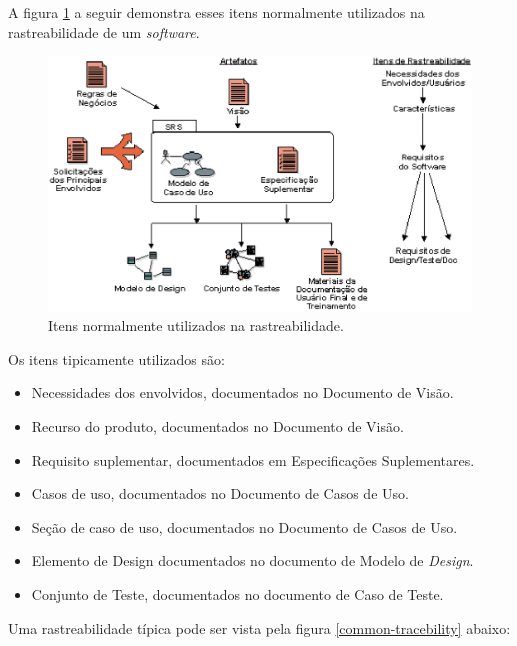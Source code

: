 A figura \ref{common-itens} a seguir demonstra esses itens normalmente utilizados na rastreabilidade de um \textit{software}.

\begin{figure}[htb]
\centering
  \includegraphics[keepaspectratio=true,scale=0.7]
  {figuras/itens_comuns.eps}
  \caption{Itens normalmente utilizados na rastreabilidade.~\cite{rup1}}
  \label{common-itens}
\end{figure}

\clearpage{}


Os itens tipicamente utilizados são:

\begin{itemize}
\item Necessidades dos envolvidos, documentados no Documento de Visão.
\item Recurso do produto, documentados no Documento de Visão.
\item Requisito suplementar, documentados em Especificações Suplementares.
\item Casos de uso, documentados no Documento de Casos de Uso.
\item Seção de caso de uso, documentados no Documento de Casos de Uso.
\item Elemento de Design documentados no documento de Modelo de \textit{Design}.
\item Conjunto de Teste, documentados no documento de Caso de Teste.
\end{itemize}

Uma rastreabilidade típica pode ser vista pela figura \ref{common-tracebility} abaixo:

